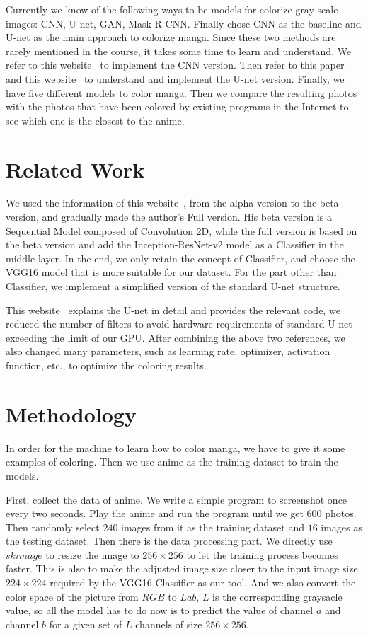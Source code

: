 \documentclass[10pt,twocolumn,letterpaper]{article}
\begin{document}
Currently we know of the following ways to be models for colorize gray-scale images: CNN, U-net, GAN, Mask R-CNN. Finally chose CNN as the baseline and U-net as the main approach to colorize manga. Since these two methods are rarely mentioned in the course, it takes some time to learn and understand. We refer to this website~\cite{CNN} to implement the CNN version. Then refer to this paper~\cite{U-net} and this website~\cite{Unet} to understand and implement the U-net version. Finally, we have five different models to color manga. Then we compare the resulting photos with the photos that have been colored by existing programs in the Internet to see which one is the closest to the anime.

\section{Related Work}
We used the information of this website~\cite{CNN}, from the alpha version to the beta version, and gradually made the author's Full version. His beta version is a Sequential Model composed of Convolution 2D, while the full version is based on the beta version and add the Inception-ResNet-v2 model as a Classifier in the middle layer. In the end, we only retain the concept of Classifier, and choose the VGG16 model that is more suitable for our dataset. For the part other than Classifier, we implement a simplified version of the standard U-net structure.

This website~\cite{U-net} explains the U-net in detail and provides the relevant code, we reduced the number of filters to avoid hardware requirements of standard U-net exceeding the limit of our GPU. After combining the above two references, we also changed many parameters, such as learning rate, optimizer, activation function, etc., to optimize the coloring results.

\section{Methodology}
In order for the machine to learn how to color manga, we have to give it some examples of coloring. Then we use anime as the training dataset to train the models.

First, collect the data of anime. We write a simple program to screenshot once every two seconds. Play the anime and run the program until we get $600$ photos. Then randomly select $240$ images from it as the training dataset and $16$ images as the testing dataset. Then there is the data processing part. We directly use $skimage$ to resize the image to $256 \times 256$ to let the training process becomes faster. This is also to make the adjusted image size closer to the input image size $224 \times 224$ required by the VGG16 Classifier as our tool. And we also convert the color space of the picture from $RGB$ to $Lab$, $L$ is the corresponding graysacle value, so all the model has to do now is to predict the value of channel $a$ and channel $b$ for a given set of $L$ channels of size $256 \times 256$.
\end{document}
